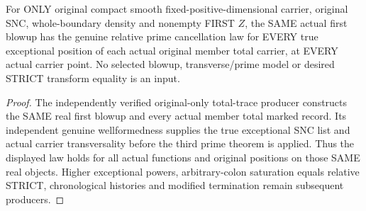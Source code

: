 \begin{theorem}
\label{hir:sharp-original-first-member-exceptional-actual-relative-prime}
\leanok
For ONLY original compact smooth fixed-positive-dimensional carrier, original
SNC, whole-boundary density and nonempty FIRST $Z$, the SAME actual first
blowup has the genuine relative prime cancellation law for EVERY true
exceptional position of each actual original member total carrier, at EVERY
actual carrier point. No selected blowup, transverse/prime model or desired
STRICT transform equality is an input.
\end{theorem}
\begin{proof}
The independently verified original-only total-trace producer constructs the
SAME real first blowup and every actual member total marked record. Its
independent genuine wellformedness supplies the true exceptional SNC list and
actual carrier transversality before the third prime theorem is applied.
Thus the displayed law holds for all actual functions and original positions
on those SAME real objects. Higher exceptional powers, arbitrary-colon
saturation equals relative STRICT, chronological histories and modified
termination remain subsequent producers.
\end{proof}
